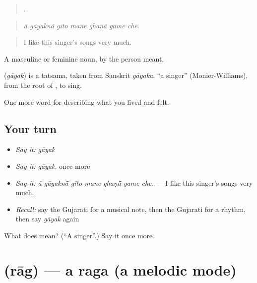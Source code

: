 \begin{quote}
      .
\end{quote}

\begin{quote}
\emph{ā gāyaknā̃ gīto mane ghaṇā̃ game che.}
\end{quote}

\begin{quote}
I like this singer's songs very much.
\end{quote}

A masculine or feminine noun, by the person meant.

\begin{cousinweb}
\textbf{} (\emph{gāyak}) is a tatsama, taken from Sanskrit \emph{gāyaka}, \textquotedblleft{}a singer\textquotedblright{} (Monier-Williams), from the root of \textbf{}, to sing.
\end{cousinweb}

\begin{grammarlens}[title={What you've built}]
One more word for describing what you lived and felt.
\end{grammarlens}

\subsection*{Your turn}
\begin{itemize}
\raggedright
  \item \emph{Say it:} \emph{gāyak}
  \item \emph{Say it:} \emph{gāyak}, once more
  \item \emph{Say it:} \emph{ā gāyaknā̃ gīto mane ghaṇā̃ game che.} — I like this singer's songs very much.
  \item \emph{Recall:} say the Gujarati for a musical note, then the Gujarati for a rhythm, then say \emph{gāyak} again
\end{itemize}

\begin{tcolorbox}[breakable,colback=teal!4,colframe=teal!35!black,title={Before you move on}]
What does  mean? (\textquotedblleft{}A singer\textquotedblright{}.) Say it once more.
\end{tcolorbox}
\section[\texorpdfstring{\gu{રાગ} (rāg)}{રાગ (rāg)}]{ (rāg) — a raga (a melodic mode)}


